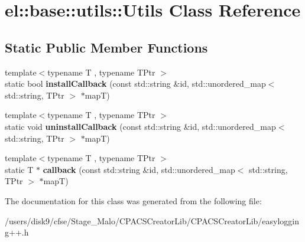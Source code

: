 \hypertarget{classel_1_1base_1_1utils_1_1Utils}{\section{el\-:\-:base\-:\-:utils\-:\-:Utils Class Reference}
\label{classel_1_1base_1_1utils_1_1Utils}
}
\subsection*{Static Public Member Functions}
\begin{DoxyCompactItemize}
\item 
\hypertarget{classel_1_1base_1_1utils_1_1Utils_a792f70b0a06056d4a17aab7a2918178c}{{\footnotesize template$<$typename T , typename T\-Ptr $>$ }\\static bool {\bfseries install\-Callback} (const std\-::string \&id, std\-::unordered\-\_\-map$<$ std\-::string, T\-Ptr $>$ $\ast$map\-T)}\label{classel_1_1base_1_1utils_1_1Utils_a792f70b0a06056d4a17aab7a2918178c}

\item 
\hypertarget{classel_1_1base_1_1utils_1_1Utils_afc216b7153e4a77fac17ad510a7acdfd}{{\footnotesize template$<$typename T , typename T\-Ptr $>$ }\\static void {\bfseries uninstall\-Callback} (const std\-::string \&id, std\-::unordered\-\_\-map$<$ std\-::string, T\-Ptr $>$ $\ast$map\-T)}\label{classel_1_1base_1_1utils_1_1Utils_afc216b7153e4a77fac17ad510a7acdfd}

\item 
\hypertarget{classel_1_1base_1_1utils_1_1Utils_ae5d5b8656737f5565ca2d5379495403f}{{\footnotesize template$<$typename T , typename T\-Ptr $>$ }\\static T $\ast$ {\bfseries callback} (const std\-::string \&id, std\-::unordered\-\_\-map$<$ std\-::string, T\-Ptr $>$ $\ast$map\-T)}\label{classel_1_1base_1_1utils_1_1Utils_ae5d5b8656737f5565ca2d5379495403f}

\end{DoxyCompactItemize}


The documentation for this class was generated from the following file\-:\begin{DoxyCompactItemize}
\item 
/users/disk9/cfse/\-Stage\-\_\-\-Malo/\-C\-P\-A\-C\-S\-Creator\-Lib/\-C\-P\-A\-C\-S\-Creator\-Lib/easylogging++.\-h\end{DoxyCompactItemize}
